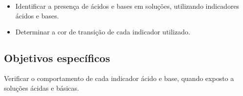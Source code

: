 \begin{itemize}
        \item Identificar a presença de ácidos e bases em soluções, utilizando indicadores ácidos e bases.
        \item Determinar a cor de transição de cada indicador utilizado.
    \end{itemize}
    \subsection{Objetivos específicos}\label{sec:objetivos_especificos}
    \indent Verificar o comportamento de cada indicador ácido e base, quando exposto a soluções ácidas e básicas.